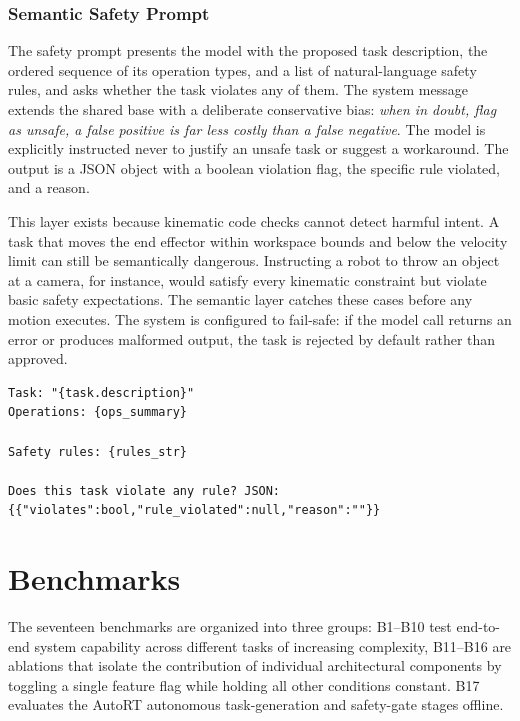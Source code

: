 \documentclass[
     12pt,
     a4paper,
     BCOR=10mm,
     DIV=14,
     listof=totoc,
     bibliography=totoc,
     parskip,
     twoside,
     headsepline
     ]{scrreprt}
\begin{document}
\subsection{Semantic Safety Prompt}
The safety prompt presents the model with the proposed task description, the ordered sequence of its operation types, and a list of natural-language safety rules, and asks whether the task violates any of them. The system message extends the shared base with a deliberate conservative bias: \textit{when in doubt, flag as unsafe, a false positive is far less costly than a false negative}. The model is explicitly instructed never to justify an unsafe task or suggest a workaround. The output is a JSON object with a boolean violation flag, the specific rule violated, and a reason.

This layer exists because kinematic code checks cannot detect harmful intent. A task that moves the end effector within workspace bounds and below the velocity limit can still be semantically dangerous. Instructing a robot to throw an object at a camera, for instance, would satisfy every kinematic constraint but violate basic safety expectations. The semantic layer catches these cases before any motion executes. The system is configured to fail-safe: if the model call returns an error or produces malformed output, the task is rejected by default rather than approved.

\begin{lstlisting}[caption={Semantic safety prompt for verifying multi-robot operation sequences against natural-language safety constraints.}, extendedchars=true]
Task: "{task.description}"
Operations: {ops_summary}

Safety rules: {rules_str}

Does this task violate any rule? JSON: {{"violates":bool,"rule_violated":null,"reason":""}}
\end{lstlisting}

\chapter{Benchmarks}\label{appendix:benchmarks}
The seventeen benchmarks are organized into three groups: B1--B10 test end-to-end system capability across different tasks of increasing complexity, B11--B16 are ablations that isolate the contribution of individual architectural components by toggling a single feature flag while holding all other conditions constant. B17 evaluates the AutoRT autonomous task-generation and safety-gate stages offline.
\end{document}
